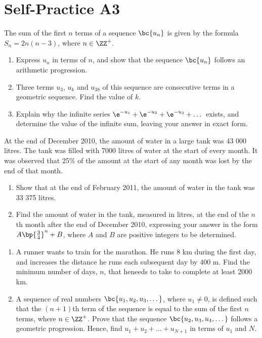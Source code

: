 \section{Self-Practice A3}

\begin{problem}
    The sum of the first $n$ terms of a sequence $\bc{u_n}$ is given by the formula $S_n = 2n(n-3)$, where $n \in \ZZ^+$.

    \begin{enumerate}
        \item Express $u_n$ in terms of $n$, and show that the sequence $\bc{u_n}$ follows an arithmetic progression.
        \item Three terms $u_3$, $u_k$ and $u_{38}$ of this sequence are consecutive terms in a geometric sequence. Find the value of $k$.
        \item Explain why the infinite series $\e^{-u_1} + \e^{-u_2} + \e^{-u_3} + \dots$ exists, and determine the value of the infinite sum, leaving your answer in exact form.
    \end{enumerate}
\end{problem}

\begin{problem}
    At the end of December 2010, the amount of water in a large tank was 43 000 litres. The tank was filled with 7000 litres of water at the start of every month. It was observed that 25\% of the amount at the start of any month was lost by the end of that month.

    \begin{enumerate}
        \item Show that at the end of February 2011, the amount of water in the tank was 33 375 litres.
        \item Find the amount of water in the tank, measured in litres, at the end of the $n$th month after the end of December 2010, expressing your answer in the form $A\bp{\frac34}^n + B$, where $A$ and $B$ are positive integers to be determined.
    \end{enumerate}
\end{problem}

\begin{problem}
    \begin{enumerate}
        \item A runner wants to train for the marathon. He runs 8 km during the first day, and increases the distance he runs each subsequent day by 400 m. Find the minimum number of days, $n$, that heneeds to take to complete at least 2000 km.
        \item A sequence of real numbers $\bc{u_1, u_2, u_3, \dots}$, where $u_1 \neq 0$, is defined such that the $(n+1)$th term of the sequence is equal to the sum of the first $n$ terms, where $n \in \ZZ^+$. Prove that the sequence $\bc{u_2, u_3, u_4, \dots}$ follows a geometric progression. Hence, find $u_1 + u_2 + \dots + u_{N+1}$ in terms of $u_1$ and $N$.
    \end{enumerate}
\end{problem}

